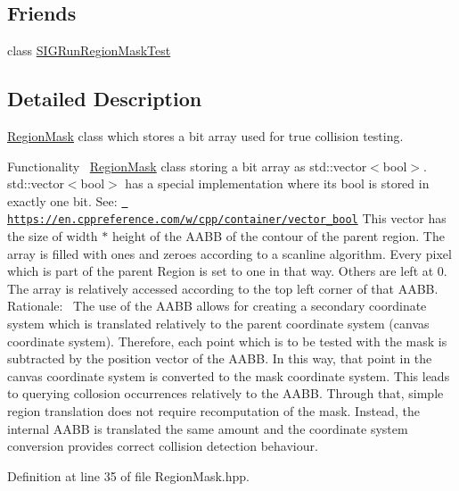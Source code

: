 \subsection*{Friends}
\begin{DoxyCompactItemize}
\item 
class \mbox{\hyperlink{class_region_mask_a32389378c4d8a7515eb9e363d10fc879}{S\+I\+G\+Run\+Region\+Mask\+Test}}
\end{DoxyCompactItemize}


\subsection{Detailed Description}
\mbox{\hyperlink{class_region_mask}{Region\+Mask}} class which stores a bit array used for true collision testing. 

Functionality~\newline
 \mbox{\hyperlink{class_region_mask}{Region\+Mask}} class storing a bit array as std\+::vector$<$bool$>$. std\+::vector$<$bool$>$ has a special implementation where its bool is stored in exactly one bit. See\+: \href{https://en.cppreference.com/w/cpp/container/vector_bool}{\texttt{ https\+://en.\+cppreference.\+com/w/cpp/container/vector\+\_\+bool}} This vector has the size of width $\ast$ height of the A\+A\+BB of the contour of the parent region. The array is filled with ones and zeroes according to a scanline algorithm. Every pixel which is part of the parent Region is set to one in that way. Others are left at 0. The array is relatively accessed according to the top left corner of that A\+A\+BB. ~\newline
 Rationale\+:~\newline
 The use of the A\+A\+BB allows for creating a secondary coordinate system which is translated relatively to the parent coordinate system (canvas coordinate system). Therefore, each point which is to be tested with the mask is subtracted by the position vector of the A\+A\+BB. In this way, that point in the canvas coordinate system is converted to the mask coordinate system. This leads to querying collosion occurrences relatively to the A\+A\+BB. Through that, simple region translation does not require recomputation of the mask. Instead, the internal A\+A\+BB is translated the same amount and the coordinate system conversion provides correct collision detection behaviour. ~\newline


Definition at line 35 of file Region\+Mask.\+hpp.



